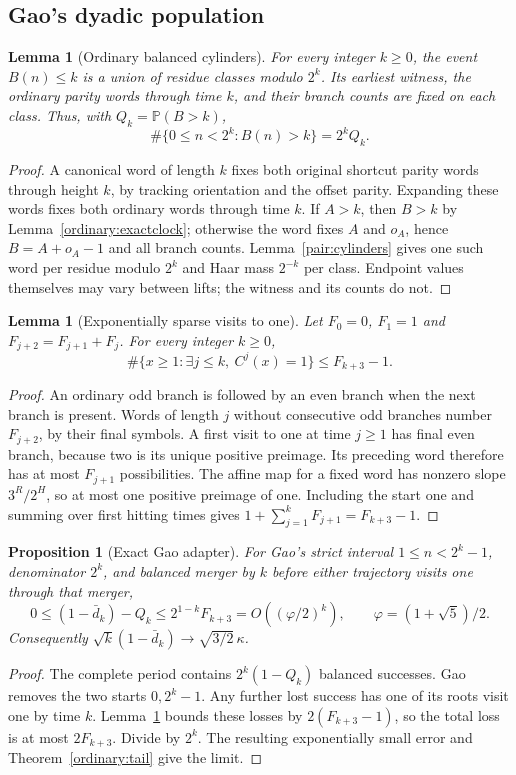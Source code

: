\documentclass[11pt]{amsart}
\newtheorem{proposition}[theorem]{Proposition}
\newtheorem{lemma}[theorem]{Lemma}
\theoremstyle{definition}
\theoremstyle{remark}
\newcommand{\PP}{\mathbb P}
\begin{document}
\subsection{Gao's dyadic population}\label{sec:gao}

\begin{lemma}[Ordinary balanced cylinders]\label{gaoexact:cylinders}
For every integer $k\ge0$, the event $B(n)\le k$ is a union of residue
classes modulo $2^k$. Its earliest witness, the ordinary parity words
through time $k$, and their branch counts are fixed on each class. Thus,
with $Q_k=\PP(B>k)$,
\[
 \#\{0\le n<2^k:B(n)>k\}=2^kQ_k.
\]
\end{lemma}
\begin{proof}
A canonical word of length $k$ fixes both original shortcut parity words
through height $k$, by tracking orientation and the offset parity.
Expanding these words fixes both ordinary words through time $k$.
If $A>k$, then $B>k$ by Lemma~\ref{ordinary:exactclock}; otherwise the
word fixes $A$ and $o_A$, hence $B=A+o_A-1$ and all branch counts.
Lemma~\ref{pair:cylinders} gives one such word per residue modulo $2^k$
and Haar mass $2^{-k}$ per class. Endpoint values themselves may vary
between lifts; the witness and its counts do not.
\end{proof}

\begin{lemma}[Exponentially sparse visits to one]\label{gaoexact:one}
Let $F_0=0$, $F_1=1$ and $F_{j+2}=F_{j+1}+F_j$. For every integer $k\ge0$,
\[
 \#\{x\ge1:\exists j\le k,\ C^j(x)=1\}\le F_{k+3}-1.
\]
\end{lemma}
\begin{proof}
An ordinary odd branch is followed by an even branch when the next branch
is present. Words of length $j$ without consecutive odd branches number
$F_{j+2}$, by their final symbols. A first visit to one at time $j\ge1$
has final even branch, because two is its unique positive preimage. Its
preceding word therefore has at most $F_{j+1}$ possibilities. The affine
map for a fixed word has nonzero slope $3^R/2^H$, so at most one positive
preimage of one. Including the start one and summing over first hitting
times gives $1+\sum_{j=1}^kF_{j+1}=F_{k+3}-1$.
\end{proof}

\begin{proposition}[Exact Gao adapter]\label{gaoexact:adapter}
For Gao's strict interval $1\le n<2^k-1$, denominator $2^k$, and balanced
merger by $k$ before either trajectory visits one through that merger,
\[
 0\le(1-\bar d_k)-Q_k\le 2^{1-k}F_{k+3}
 =O((\varphi/2)^k),\qquad \varphi=(1+\sqrt5)/2.
\]
Consequently $\sqrt k(1-\bar d_k)\to\sqrt{3/2}\,\kappa$.
\end{proposition}
\begin{proof}
The complete period contains $2^k(1-Q_k)$ balanced successes. Gao removes
the two starts $0,2^k-1$. Any further lost success has one of its roots
visit one by time $k$. Lemma~\ref{gaoexact:one} bounds these losses by
$2(F_{k+3}-1)$, so the total loss is at most $2F_{k+3}$. Divide by $2^k$.
The resulting exponentially small error and Theorem~\ref{ordinary:tail}
give the limit.
\end{proof}
\end{document}
